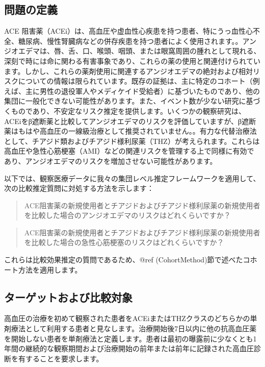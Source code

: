 \documentclass[
  11pt]{book}
\theoremstyle{definition}
\theoremstyle{definition}
\theoremstyle{definition}
\theoremstyle{definition}
\theoremstyle{remark}
\begin{document}
\subsection{問題の定義}\label{ux554fux984cux306eux5b9aux7fa9-1}

ACE 阻害薬（ACEi）は、高血圧や虚血性心疾患を持つ患者、特にうっ血性心不全、糖尿病、慢性腎臓病などの併存疾患を持つ患者によく使用されます。\citep[ ]{zaman_2002}。アンジオエデマは、唇、舌、口、喉頭、咽頭、または眼窩周囲の腫れとして現れる、深刻で時には命に関わる有害事象であり、これらの薬の使用と関連付けられています。\citep[ ]{sabroe_1997}しかし、これらの薬剤使用に関連するアンジオエデマの絶対および相対リスクについての情報は限られています。既存の証拠は、主に特定のコホート（例えば、主に男性の退役軍人やメディケイド受給者）に基づいたものであり、他の集団に一般化できない可能性があります。また、イベント数が少ない研究に基づくものであり、不安定なリスク推定を提供します。\citep[ ]{powers_2012}いくつかの観察研究は、ACEiをβ遮断薬と比較してアンジオエデマのリスクを評価しています\citep[ ]{magid_2010, toh_2012}が、β遮断薬はもはや高血圧の一線級治療として推奨されていません。\citep[ ]{whelton_2018}。有力な代替治療法として、チアジド類およびチアジド様利尿薬（THZ）が考えられます。これらは高血圧や急性心筋梗塞（AMI）などの関連リスクを管理する上で同様に有効であり、アンジオエデマのリスクを増加させない可能性があります。

以下では、観察医療データに我々の集団レベル推定フレームワークを適用して、次の比較推定質問に対処する方法を示します：

\begin{quote}
ACE阻害薬の新規使用者とチアジドおよびチアジド様利尿薬の新規使用者を比較した場合のアンジオエデマのリスクはどれくらいですか？
\end{quote}

\begin{quote}
ACE阻害薬の新規使用者とチアジドおよびチアジド様利尿薬の新規使用者を比較した場合の急性心筋梗塞のリスクはどれくらいですか？
\end{quote}

これらは比較効果推定の質問であるため、@ref (CohortMethod)節で述べたコホート方法を適用します。

\subsection{ターゲットおよび比較対象}\label{ux30bfux30fcux30b2ux30c3ux30c8ux304aux3088ux3073ux6bd4ux8f03ux5bfeux8c61}

高血圧の治療を初めて観察された患者をACEiまたはTHZクラスのどちらかの単剤療法として利用する患者と見なします。治療開始後7日以内に他の抗高血圧薬を開始しない患者を単剤療法と定義します。患者は最初の曝露前に少なくとも1年間の継続的な観察期間および治療開始の前年または前年に記録された高血圧診断を有することを要求します。
\end{document}
